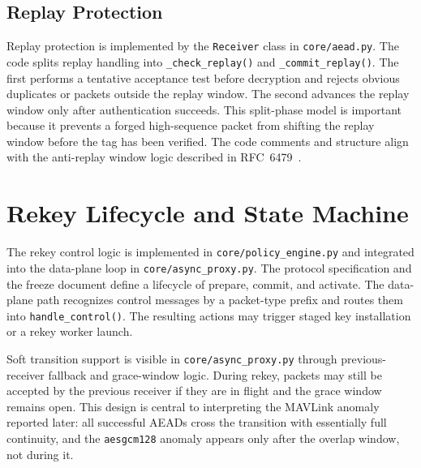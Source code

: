 \documentclass[conference]{IEEEtran}
\begin{document}
\subsection{Replay Protection}
Replay protection is implemented by the \texttt{Receiver} class in \texttt{core/aead.py}. The code splits replay handling into \texttt{\_check\_replay()} and \texttt{\_commit\_replay()}. The first performs a tentative acceptance test before decryption and rejects obvious duplicates or packets outside the replay window. The second advances the replay window only after authentication succeeds. This split-phase model is important because it prevents a forged high-sequence packet from shifting the replay window before the tag has been verified. The code comments and structure align with the anti-replay window logic described in RFC~6479~\cite{rfc6479}.

\section{Rekey Lifecycle and State Machine}
The rekey control logic is implemented in \texttt{core/policy\_engine.py} and integrated into the data-plane loop in \texttt{core/async\_proxy.py}. The protocol specification and the freeze document define a lifecycle of prepare, commit, and activate. The data-plane path recognizes control messages by a packet-type prefix and routes them into \texttt{handle\_control()}. The resulting actions may trigger staged key installation or a rekey worker launch.

Soft transition support is visible in \texttt{core/async\_proxy.py} through previous-receiver fallback and grace-window logic. During rekey, packets may still be accepted by the previous receiver if they are in flight and the grace window remains open. This design is central to interpreting the MAVLink anomaly reported later: all successful AEADs cross the transition with essentially full continuity, and the \texttt{aesgcm128} anomaly appears only after the overlap window, not during it.
\end{document}
